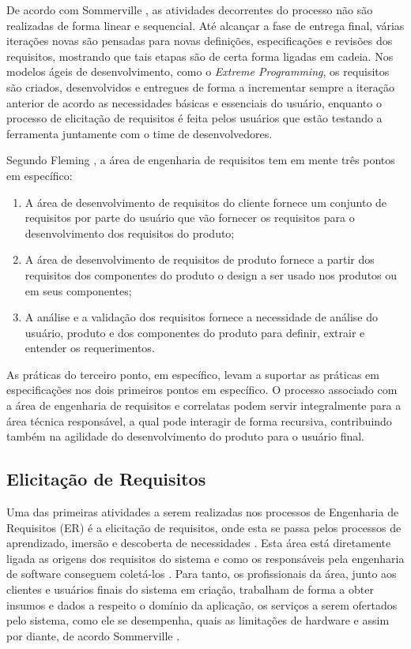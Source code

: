 De acordo com Sommerville \cite{Sommerville07}, as atividades decorrentes do processo não são realizadas de forma linear e sequencial. Até alcançar a fase de entrega final, várias iterações novas são pensadas para novas definições, especificações e revisões dos requisitos, mostrando que tais etapas são de certa forma ligadas em cadeia. Nos modelos ágeis de desenvolvimento, como o \textit{Extreme Programming}, os requisitos são criados, desenvolvidos e entregues de forma a incrementar sempre a iteração anterior de acordo as necessidades básicas e essenciais do usuário, enquanto o processo de elicitação de requisitos é feita pelos usuários que estão testando a ferramenta juntamente com o time de desenvolvedores.
 
 Segundo Fleming \cite{cmmi}, a área de engenharia de requisitos tem em mente três pontos em específico: 
 
 \begin{enumerate}
     \item A área de desenvolvimento de requisitos do cliente fornece um conjunto de requisitos por parte do usuário que vão fornecer os requisitos para o desenvolvimento dos requisitos do produto;
     \item A área de desenvolvimento de requisitos de produto fornece a partir dos requisitos dos componentes do produto o design a ser usado nos produtos ou em seus componentes;
     \item A análise e a validação dos requisitos fornece a necessidade de análise do usuário, produto e dos componentes do produto para definir, extrair e entender os requerimentos.
 \end{enumerate}

 As práticas do terceiro ponto, em específico, levam a suportar as práticas em especificações nos dois primeiros pontos em específico. O processo associado com a área de engenharia de requisitos e correlatas podem servir integralmente para a área técnica responsável, a qual pode interagir de forma recursiva, contribuindo também na agilidade do desenvolvimento do produto para o usuário final.
 
 \subsection{Elicitação de Requisitos}
 
 Uma das primeiras atividades a serem realizadas nos processos de Engenharia de Requisitos (\acrshort{ER}) é a elicitação de requisitos, onde esta se passa pelos processos de aprendizado, imersão e descoberta de necessidades \cite{Hadar}. Esta área está diretamente ligada as origens dos requisitos do sistema e como os responsáveis pela engenharia de software conseguem coletá-los \cite{SWEBOK2014}. Para tanto, os profissionais da área, junto aos clientes e usuários finais do sistema em criação, trabalham de forma a obter insumos e dados a respeito o domínio da aplicação, os serviços a serem ofertados pelo sistema, como ele se desempenha, quais as limitações de hardware e assim por diante, de acordo Sommerville \cite{Sommerville07}.

